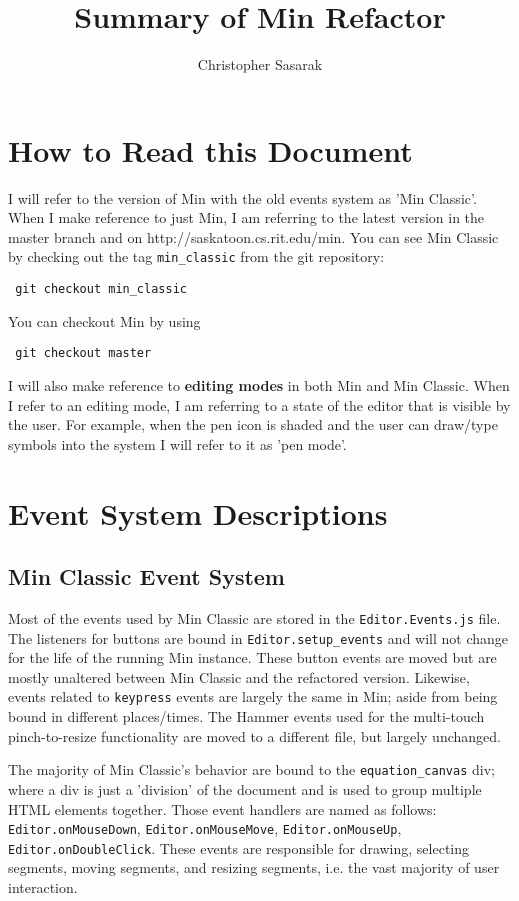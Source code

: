 \documentclass[letterpaper]{article}
\begin{document}
\author{Christopher Sasarak} \title{Summary of Min Refactor} \maketitle

\section*{How to Read this Document}

I will refer to the version of Min with the old events system as 'Min Classic'.
When I make reference to just Min, I am referring to the latest version in the
master branch and on http://saskatoon.cs.rit.edu/min.
You can see Min Classic by checking out the tag \verb+min_classic+ from the git
repository: \begin{verbatim} git checkout min_classic \end{verbatim} You can
checkout Min by using \begin{verbatim} git checkout master \end{verbatim}

I will also make reference to \textbf{editing modes} in both Min and Min Classic.
When I refer to an editing mode, I am referring to a state of the editor that is
visible by the user. For example, when the pen icon is shaded and the user can
draw/type symbols into the system I will refer to it as 'pen mode'.

\section*{Event System Descriptions}

\subsection*{Min Classic Event System} 
Most of the events used by Min Classic are stored in the \verb+Editor.Events.js+ file. 
The listeners for buttons are bound in \verb+Editor.setup_events+ and will not
change for the life of the running Min instance. These button events are moved
but are mostly unaltered between Min Classic and the refactored
version. Likewise, events related to \verb+keypress+ events are largely the
same in Min; aside from being bound in different places/times. The Hammer events
used for the multi-touch pinch-to-resize functionality are moved to a different
file, but largely unchanged.

The majority of Min Classic's behavior are bound to the \verb+equation_canvas+
div; where a div is just a 'division' of the document and is used to group multiple
HTML elements together. Those event handlers are named as follows:
\verb+Editor.onMouseDown+, \verb+Editor.onMouseMove+,
\verb+Editor.onMouseUp+, \verb+Editor.onDoubleClick+. These events are
responsible for drawing, selecting segments, moving segments, and resizing
segments, i.e. the vast majority of user interaction. 
\end{document}
